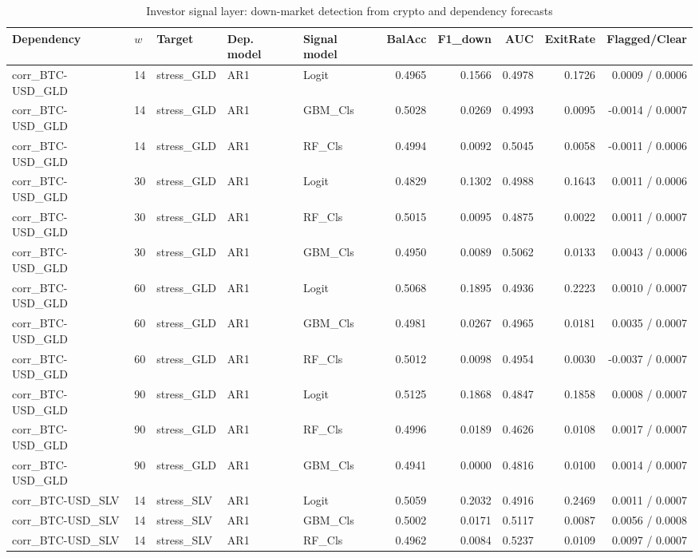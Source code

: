 \begin{table}[H]
\centering
\small
\caption{Investor signal layer: down-market detection from crypto and dependency forecasts}
\label{tab:signal_metrics}
\begin{tabular}{lllllrrrrr}
\toprule
Dependency & $w$ & Target & Dep. model & Signal model & BalAcc & F1_down & AUC & ExitRate & Flagged/Clear \\
\midrule
corr_BTC-USD_GLD & 14 & stress_GLD & AR1 & Logit & 0.4965 & 0.1566 & 0.4978 & 0.1726 & 0.0009 / 0.0006 \\
corr_BTC-USD_GLD & 14 & stress_GLD & AR1 & GBM_Cls & 0.5028 & 0.0269 & 0.4993 & 0.0095 & -0.0014 / 0.0007 \\
corr_BTC-USD_GLD & 14 & stress_GLD & AR1 & RF_Cls & 0.4994 & 0.0092 & 0.5045 & 0.0058 & -0.0011 / 0.0006 \\
corr_BTC-USD_GLD & 30 & stress_GLD & AR1 & Logit & 0.4829 & 0.1302 & 0.4988 & 0.1643 & 0.0011 / 0.0006 \\
corr_BTC-USD_GLD & 30 & stress_GLD & AR1 & RF_Cls & 0.5015 & 0.0095 & 0.4875 & 0.0022 & 0.0011 / 0.0007 \\
corr_BTC-USD_GLD & 30 & stress_GLD & AR1 & GBM_Cls & 0.4950 & 0.0089 & 0.5062 & 0.0133 & 0.0043 / 0.0006 \\
corr_BTC-USD_GLD & 60 & stress_GLD & AR1 & Logit & 0.5068 & 0.1895 & 0.4936 & 0.2223 & 0.0010 / 0.0007 \\
corr_BTC-USD_GLD & 60 & stress_GLD & AR1 & GBM_Cls & 0.4981 & 0.0267 & 0.4965 & 0.0181 & 0.0035 / 0.0007 \\
corr_BTC-USD_GLD & 60 & stress_GLD & AR1 & RF_Cls & 0.5012 & 0.0098 & 0.4954 & 0.0030 & -0.0037 / 0.0007 \\
corr_BTC-USD_GLD & 90 & stress_GLD & AR1 & Logit & 0.5125 & 0.1868 & 0.4847 & 0.1858 & 0.0008 / 0.0007 \\
corr_BTC-USD_GLD & 90 & stress_GLD & AR1 & RF_Cls & 0.4996 & 0.0189 & 0.4626 & 0.0108 & 0.0017 / 0.0007 \\
corr_BTC-USD_GLD & 90 & stress_GLD & AR1 & GBM_Cls & 0.4941 & 0.0000 & 0.4816 & 0.0100 & 0.0014 / 0.0007 \\
corr_BTC-USD_SLV & 14 & stress_SLV & AR1 & Logit & 0.5059 & 0.2032 & 0.4916 & 0.2469 & 0.0011 / 0.0007 \\
corr_BTC-USD_SLV & 14 & stress_SLV & AR1 & GBM_Cls & 0.5002 & 0.0171 & 0.5117 & 0.0087 & 0.0056 / 0.0008 \\
corr_BTC-USD_SLV & 14 & stress_SLV & AR1 & RF_Cls & 0.4962 & 0.0084 & 0.5237 & 0.0109 & 0.0097 / 0.0007 \\

\end{tabular}
\end{table}

